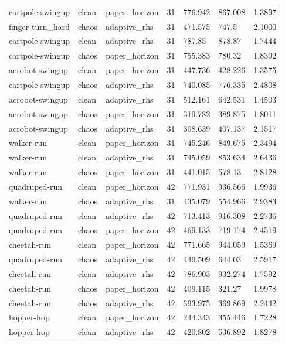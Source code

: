 \begin{tabular}{lllllll}
cartpole-swingup & clean & paper\_horizon & 31 & 776.942 & 867.008 & 1.3897 \\
finger-turn\_hard & chaos & adaptive\_rhs & 31 & 471.575 & 747.5 & 2.1000 \\
cartpole-swingup & clean & adaptive\_rhs & 31 & 787.85 & 878.87 & 1.7444 \\
cartpole-swingup & chaos & paper\_horizon & 31 & 755.383 & 780.32 & 1.8392 \\
acrobot-swingup & clean & paper\_horizon & 31 & 447.736 & 428.226 & 1.3575 \\
cartpole-swingup & chaos & adaptive\_rhs & 31 & 740.085 & 776.335 & 2.4808 \\
acrobot-swingup & clean & adaptive\_rhs & 31 & 512.161 & 642.531 & 1.4503 \\
acrobot-swingup & chaos & paper\_horizon & 31 & 319.782 & 389.875 & 1.8011 \\
acrobot-swingup & chaos & adaptive\_rhs & 31 & 308.639 & 407.137 & 2.1517 \\
walker-run & clean & paper\_horizon & 31 & 745.246 & 849.675 & 2.3494 \\
walker-run & clean & adaptive\_rhs & 31 & 745.059 & 853.634 & 2.6436 \\
walker-run & chaos & paper\_horizon & 31 & 441.015 & 578.13 & 2.8128 \\
quadruped-run & clean & paper\_horizon & 42 & 771.931 & 936.566 & 1.9936 \\
walker-run & chaos & adaptive\_rhs & 31 & 435.079 & 554.966 & 2.9383 \\
quadruped-run & clean & adaptive\_rhs & 42 & 713.413 & 916.308 & 2.2736 \\
quadruped-run & chaos & paper\_horizon & 42 & 469.133 & 719.174 & 2.4519 \\
cheetah-run & clean & paper\_horizon & 42 & 771.665 & 944.059 & 1.5369 \\
quadruped-run & chaos & adaptive\_rhs & 42 & 449.509 & 644.03 & 2.5917 \\
cheetah-run & clean & adaptive\_rhs & 42 & 786.903 & 932.274 & 1.7592 \\
cheetah-run & chaos & paper\_horizon & 42 & 409.115 & 321.27 & 1.9978 \\
cheetah-run & chaos & adaptive\_rhs & 42 & 393.975 & 369.869 & 2.2442 \\
hopper-hop & clean & paper\_horizon & 42 & 244.343 & 355.446 & 1.7228 \\
hopper-hop & clean & adaptive\_rhs & 42 & 420.802 & 536.892 & 1.8278 \\

\end{tabular}
